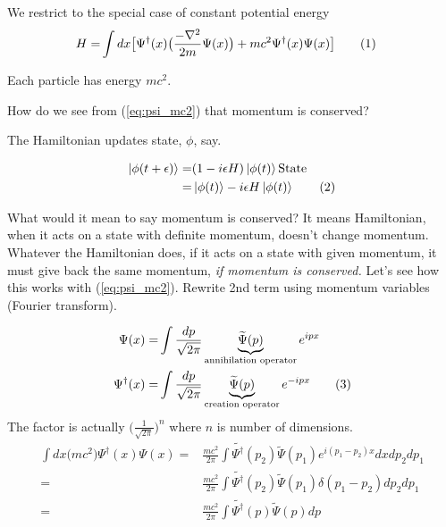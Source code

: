 \documentclass[]{article}
\newcommand\numberthis{\addtocounter{equation}{1}\tag{\theequation}}
\begin{document}
We restrict to the special case of constant potential energy
\begin{align*}
H=&\int dx \big[\Psi^\dagger(x) \big(\frac{- \nabla^2}{2m} \Psi(x)\big) + mc^2 \Psi^\dagger(x) \Psi(x)\big]  \numberthis\label{eq:psi_mc2}
\end{align*}

Each particle has energy $mc^2$.

How do we see from (\ref{eq:psi_mc2}) that momentum is conserved?

The Hamiltonian updates state, $\phi$, say.

\begin{align*}
	\ket{\phi(t+\epsilon)} =& (1-i \epsilon H) \ket{\phi(t)} \text{State}\\
	=& \ket{\phi(t)} -i \epsilon H \ket{\phi(t)} \numberthis \label{eq:update:state}
\end{align*}

What would it mean to say momentum is conserved? It means Hamiltonian, when it acts on a state with definite momentum, doesn't change momentum. Whatever the Hamiltonian does, if it acts on a state with given momentum, it must give back the same momentum, \emph{if momentum is conserved.}  Let's see how this works with (\ref{eq:psi_mc2}). Rewrite 2nd term  using momentum variables (Fourier transform).

\begin{align*}
	\Psi(x) =& \int \frac{dp}{\sqrt{2\pi}} \underbrace{ \widetilde{\Psi}(p)}_\text{annihilation operator} e^{ipx}\\
	\Psi^\dagger (x) =& \int \frac{dp}{\sqrt{2\pi}} \underbrace{ \widetilde{\Psi}(p)}_\text{creation operator} e^{-ipx} \numberthis \label{eq:psi:dagger}
\end{align*}
 The factor is actually $\big(\frac{1}{\sqrt{2\pi}}\big)^n$ where $n$ is number of dimensions.
\begin{align*}
	\int dx \big(mc^2\big) \Psi^\dagger(x) \Psi(x) =& \frac{mc^2}{2 \pi} \int \widetilde{\Psi^\dagger}(p_2) \widetilde{\Psi}(p_1) e^{i(p_1-p_2)x} dx dp_2 dp_1\\
	=& \frac{mc^2}{2 \pi} \int \widetilde{\Psi^\dagger}(p_2) \widetilde{\Psi}(p_1) \delta(p_1-p_2) dp_2 dp_1\\
	=& \frac{mc^2}{2 \pi} \int \widetilde{\Psi^\dagger}(p) \widetilde{\Psi}(p) dp
\end{align*}
\end{document}
